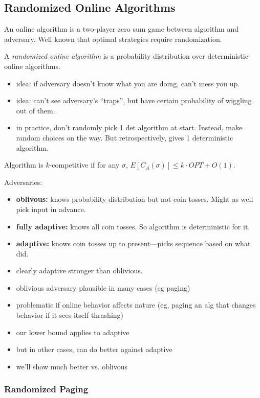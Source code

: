 \documentclass{article}
\begin{document}
\vspace{0.5cm}
\subsection*{Randomized Online Algorithms}

An online algorithm is a two-player zero sum
game between algorithm and adversary.  Well known that optimal
strategies require randomization.

A \emph{randomized online algorithm} is a probability distribution over
deterministic online algorithms.
\begin{itemize}
\item idea: if adversary doesn't know what you are doing, can't mess
  you up.
\item idea: can't see adversary's ``traps'', but have certain
  probability of wiggling out of them.
\item in practice, don't randomly pick 1 det algorithm at start.
  Instead, make random choices on the way.  But retrospectively, gives
  1 deterministic algorithm.
\end{itemize}

Algorithm is $k$-competitive if for any $\sigma$, $E[C_A(\sigma)] \le
k\cdot OPT+O(1)$.

Adversaries:
\begin{itemize}
\item \textbf{oblivous:} knows probability distribution but not coin
  tosses.  Might as well pick input in advance.
\item \textbf{fully adaptive:} knows all coin tosses.  So algorithm is
  deterministic for it.
\item \textbf{adaptive:} knows coin tosses up to present---picks sequence
  based on what did.
\item clearly adaptive stronger than oblivious.  
\item oblivious adversary plausible in many cases (eg paging)
\item problematic if online behavior affects nature (eg, paging an alg
  that changes behavior if it sees itself thrashing)
\item our lower bound applies to adaptive
\item but in other cases, can do better against adaptive
\item we'll show much better vs. oblivous
\end{itemize}



\subsubsection{Randomized Paging}
\end{document}
